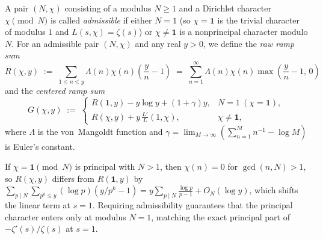 \begin{definition}
\label{def:02:ramp}
A pair $(N, \chi)$ consisting of a modulus $N \ge 1$ and a Dirichlet character $\chi \pmod{N}$ is called \emph{admissible} if either $N = 1$ (so $\chi = \mathbf{1}$ is the trivial character of modulus $1$ and $L(s,\chi) = \zeta(s)$) or $\chi \neq \mathbf{1}$ is a nonprincipal character modulo $N$. For an admissible pair $(N, \chi)$ and any real $y > 0$, we define the \emph{raw ramp sum}
\begin{equation}
\label{eq:02:raw-ramp}
  R(\chi, y) \;:=\; \sum_{1 \le n \le y} \Lambda(n)\chi(n)\!\left(\frac{y}{n} - 1\right)
  \;=\; \sum_{n=1}^{\infty} \Lambda(n)\chi(n)\max\!\left(\frac{y}{n} - 1,\, 0\right)
\end{equation}
and the \emph{centered ramp sum}
\begin{equation}
\label{eq:02:centered-ramp}
  G(\chi, y) \;:=\;
  \begin{cases}
    \displaystyle R(\mathbf{1}, y) - y\log y + (1 + \gamma)y, & N = 1\ (\chi = \mathbf{1}), \\[6pt]
    \displaystyle R(\chi, y) + y\,\frac{L'}{L}(1, \chi), & \chi \neq \mathbf{1},
  \end{cases}
\end{equation}
where $\Lambda$ is the von~Mangoldt function and $\gamma = \lim_{M\to\infty}(\sum_{n=1}^M n^{-1} - \log M)$ is Euler's constant.
\end{definition}

\begin{remark}
If $\chi = \mathbf{1} \pmod{N}$ is principal with $N > 1$, then $\chi(n) = 0$ for $\gcd(n, N) > 1$, so $R(\chi, y)$ differs from $R(\mathbf{1}, y)$ by $\sum_{p \mid N}\sum_{p^k \le y} (\log p)(y/p^k - 1) = y\sum_{p \mid N}\frac{\log p}{p-1} + O_N(\log y)$, which shifts the linear term at $s=1$. Requiring admissibility guarantees that the principal character enters only at modulus $N=1$, matching the exact principal part of $-\zeta'(s)/\zeta(s)$ at $s=1$.
\end{remark}

